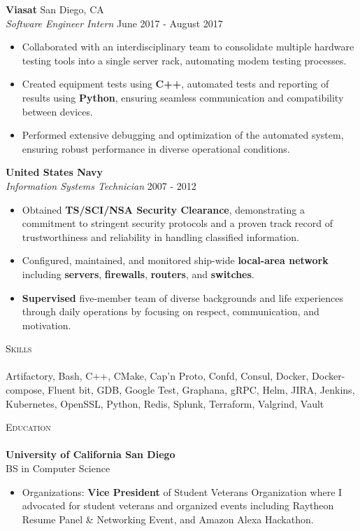 \documentclass[a4paper]{article}
\newcommand{\lineunder} {
    \vspace*{-8pt} \\
    \hspace*{-18pt} \hrulefill \\
}
\newcommand{\header} [1] {
    {\hspace*{-18pt}\vspace*{6pt} \textsc{#1}}
    \vspace*{-6pt} \lineunder
}
\begin{document}
\vspace{-1mm}
\textbf{Viasat} \hfill San Diego, CA\\
\textit{Software Engineer Intern} \hfill June 2017 - August 2017\\
\vspace{-1mm}
\begin{itemize} \itemsep 1pt
    \item Collaborated with an interdisciplinary team to consolidate multiple hardware testing tools into a single server rack, automating modem testing processes.
    \item Created equipment tests using \textbf{C++}, automated tests and reporting of results using \textbf{Python}, ensuring seamless communication and compatibility between devices.
    \item Performed extensive debugging and optimization of the automated system, ensuring robust performance in diverse operational conditions.
\end{itemize}

\textbf{United States Navy} \hfill \\
\textit{Information Systems Technician} \hfill 2007 - 2012\\
\vspace{-1mm}
\begin{itemize} \itemsep 1pt
	\item Obtained \textbf{TS/SCI/NSA Security Clearance}, demonstrating a commitment to stringent security protocols and a proven track record of trustworthiness and reliability in handling classified information.
	\item Configured, maintained, and monitored ship-wide \textbf{local-area network} including \textbf{servers}, \textbf{firewalls}, \textbf{routers}, and \textbf{switches}.
	\item \textbf{Supervised} five-member team of diverse backgrounds and life experiences through daily operations by focusing on respect, communication, and motivation.
\end{itemize}

\header{Skills}
Artifactory, Bash, C++, CMake, Cap'n Proto, Confd, Consul, Docker, Docker-compose, Fluent bit, GDB, Google Test, Graphana, gRPC, Helm, JIRA, Jenkins, Kubernetes, OpenSSL, Python, Redis, Splunk, Terraform, Valgrind, Vault
\\
\vspace{2mm}

\header{Education}
\textbf{University of California San Diego}\hfill \\
BS in Computer Science \hfill \\
\begin{itemize} \itemsep 1pt
	\item Organizations: \textbf{Vice President} of Student Veterans Organization where I advocated for student veterans and organized events including Raytheon Resume Panel \& Networking Event, and Amazon Alexa Hackathon.
\end{itemize}

\vspace{2mm}
\end{document}

